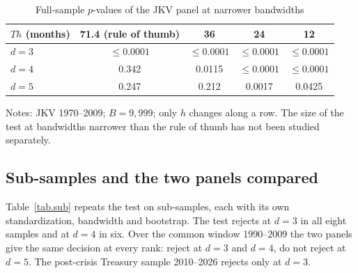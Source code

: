 \documentclass[11pt]{article}
\begin{document}
\begin{table}[htbp]
\centering
\begin{threeparttable}
\caption{Full-sample $p$-values of the JKV panel at narrower bandwidths}\label{tab.bw}
\begin{tabular}{lcccc}
\toprule
$Th$ (months) & 71.4 (rule of thumb) & 36 & 24 & 12\\
\midrule
$d=3$ & $\le 0.0001$ & $\le 0.0001$ & $\le 0.0001$ & $\le 0.0001$\\
$d=4$ & 0.342 & 0.0115 & $\le 0.0001$ & $\le 0.0001$\\
$d=5$ & 0.247 & 0.212 & 0.0017 & 0.0425\\
\bottomrule
\end{tabular}
\begin{tablenotes}\small
\item Notes: JKV 1970--2009; $B=9{,}999$; only $h$ changes along a row. The size of the test at bandwidths narrower than the rule of thumb has not been studied separately.
\end{tablenotes}
\end{threeparttable}
\end{table}

\subsection{Sub-samples and the two panels compared}

Table~\ref{tab.sub} repeats the test on sub-samples, each with its own standardization, bandwidth and bootstrap. The test rejects at $d=3$ in all eight samples and at $d=4$ in six. Over the common window 1990--2009 the two panels give the same decision at every rank: reject at $d=3$ and $d=4$, do not reject at $d=5$. The post-crisis Treasury sample 2010--2026 rejects only at $d=3$.
\end{document}
